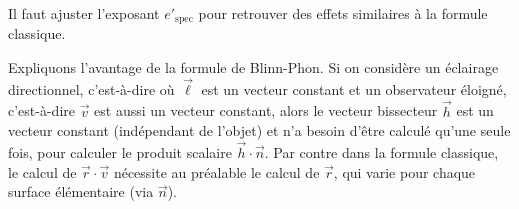\documentclass[11pt,class=report,crop=false]{standalone}
\begin{document}
Il faut ajuster l'exposant $e'_{\text{spec}}$ pour retrouver des effets similaires à la formule classique.

Expliquons l'avantage de la formule de Blinn-Phon. Si on considère un éclairage directionnel, c'est-à-dire où $\vec\ell$ est un vecteur constant et un observateur éloigné, c'est-à-dire $\vec v$ est aussi un vecteur constant, alors le vecteur bissecteur $\vec h$ est un vecteur constant (indépendant de l'objet) et n'a besoin d'être calculé qu'une seule fois, pour calculer le produit scalaire  $\vec h\cdot\vec n$. Par contre dans la formule classique, le calcul de $\vec r \cdot \vec v$ nécessite au préalable le calcul de $\vec r$, qui varie pour chaque surface élémentaire (via $\vec n$).
\end{document}
